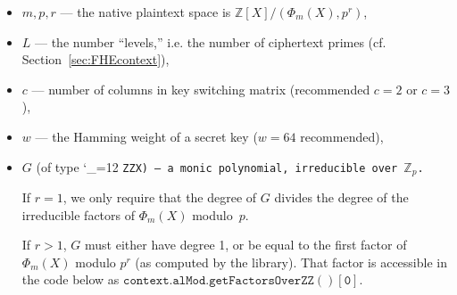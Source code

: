 \documentclass[14pt]{extarticle}
\newcommand{\secref}[1]{Section~\protect\ref{sec:#1}}
\newcommand{\Z}{\mathbb{Z}}
\def\class{%
\begingroup\catcode`\_=12\relax
\classwitharg}
\def\classwitharg#1{\tt #1\endgroup}
\begin{document}
\begin{itemize}
\item
$m, p, r$ --- the native plaintext space is $\Z[X]/(\Phi_m(X), p^r)$,

\item
$L$ --- the number ``levels,'' i.e. the number of ciphertext primes
(cf. \secref{FHEcontext}),

\item
$c$ --- number of columns in key switching matrix (recommended $c = 2$
or $c=3$),

\item
$w$ --- the Hamming weight of a secret key ($w = 64$ recommended),

\item
$G$ (of type \class{ZZX}) --- a monic polynomial, irreducible over $\Z_p$.

If $r = 1$, we only require that the degree of $G$ divides the degree
of the irreducible factors of $\Phi_m(X)$ modulo~$p$.

If $r > 1$, $G$ must either have degree 1, or be equal to the
first factor of $\Phi_m(X)$ modulo $p^r$ (as computed by the library).
That factor is accessible in the code below as
$\mathtt{context.alMod.getFactorsOverZZ()[0]}$.
\end{itemize}
\end{document}
